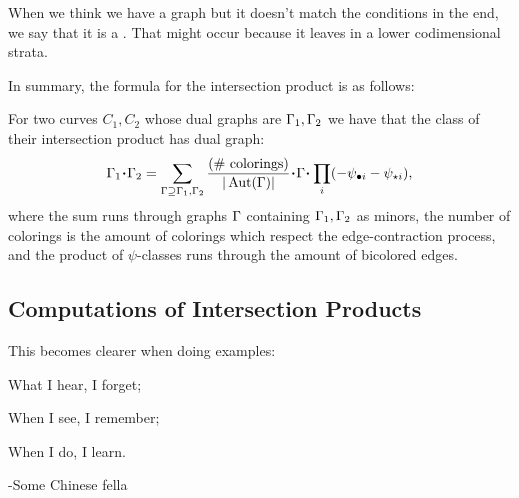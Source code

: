 \documentclass[12pt]{memoir}
\begin{document}
\begin{Rmk}
    When we think we have a graph but it doesn't match the conditions in the end, we say that it is a . That might occur because it leaves in a lower codimensional strata.
\end{Rmk}

In summary, the formula for the intersection product is as follows:

\begin{Prop}\label{prop-intersection-prod-formula-for-dual-graphs}
    For two curves $C_1,C_2$ whose dual graphs are $\Gamma_1,\Gamma_2$ we have that the class of their intersection product has dual graph:
    $$\Ga_1\.\Ga_2=\sum_{\Ga\supseteq\Ga_1,\Ga_2}\frac{(\#\text{ colorings})}{|\Aut(\Ga)|}\.\Ga\.\prod_{i}(-\psi_{\8 i}-\psi_{\star i}),$$
    where the sum runs through graphs $\Gamma$ containing $\Gamma_1,\Gamma_2$ as minors, the number of colorings is the amount of colorings which respect the edge-contraction process, and the product of $\psi$-classes runs through the amount of bicolored edges.
\end{Prop}


\subsection{Computations of Intersection Products}
This becomes clearer when doing examples:

\begin{significant}
    What I hear, I forget;\par
    When I see, I remember;\par
    When I do, I learn.\par
    -Some Chinese fella
\end{significant}
\end{document}
